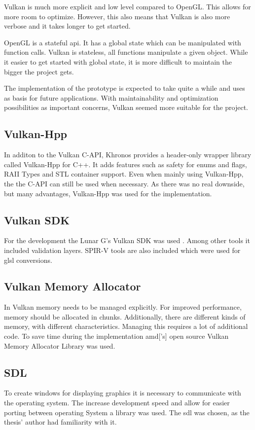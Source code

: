 Vulkan is much more explicit and low level compared to OpenGL. This allows for more room to optimize. However, this also means that Vulkan is also more verbose and it takes longer to get started.

OpenGL is a stateful \gls{api}. It has a global state which can be manipulated with function calls. Vulkan is stateless, all functions manipulate a given object. While it easier to get started with global state, it is more difficult to maintain the bigger the project gets.

The implementation of the prototype is expected to take quite a while and uses as basis for future applications. With maintainability and optimization possibilities as important concerns, Vulkan seemed more suitable for the project. 


\subsection{Vulkan-Hpp}
In additon to the Vulkan C-API, Khronos provides a header-only wrapper library called Vulkan-Hpp for C++. It adds features such as safety for enums and flags, RAII Types and STL container support. Even when mainly using Vulkan-Hpp, the the C-API can still be used when necessary. As there was no real downside, but many advantages, Vulkan-Hpp was used for the implementation.


\subsection{Vulkan SDK}
For the development the Lunar G's Vulkan SDK was used \cite{lunarg:vulkansdk}. Among other tools it included validation layers. SPIR-V tools are also included which were used for \gls{glsl} conversions.

\subsection{Vulkan Memory Allocator}
In Vulkan memory needs to be managed explicitly. For improved performance, memory should be allocated in chunks. Additionally, there are different kinds of memory, with different characteristics. Managing this requires a lot of additional code. To save time during the implementation \gls{amd}['s] open source Vulkan Memory Allocator Library \cite{amd:vulkanmemoryallocator} was used.


\subsection{SDL}
To create windows for displaying graphics it is necessary to communicate with the operating system. The increase development speed and allow for easier porting between operating System a library was used. The \gls{sdl} \cite{sdl} was chosen, as the thesis' author had familiarity with it.

